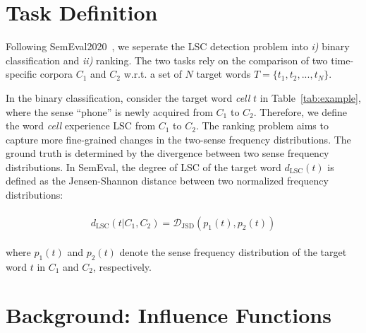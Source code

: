 
\section{Task Definition}


Following SemEval2020~\cite{semeval2020}, we seperate the LSC detection problem into \textit{i)} binary classification and \textit{ii)} ranking.
The two tasks rely on the comparison of two time-specific corpora $C_1$ and $C_2$ w.r.t. a set of $N$ target words $T = \{t_1, t_2, ..., t_N\}$.

In the binary classification, consider the target word \textit{cell} $t$ in Table~\ref{tab:example}, where the sense ``phone'' is newly acquired from $C_1$ to $C_2$. 
Therefore, we define the word \textit{cell} experience LSC from $C_1$ to $C_2$.
The ranking problem aims to capture more fine-grained changes in the two-sense frequency distributions. 
The ground truth is determined by the divergence between two sense frequency distributions.
In SemEval, the degree of LSC of the target word $d_\text{LSC}(t)$ is defined as the Jensen-Shannon distance between two normalized frequency distributions:


\begin{align*} 
\begin{split}
    d_\text{LSC}(t | C_1, C_2) = \mathcal{D}_\text{JSD}(p_1(t), p_2(t))
\end{split}
\end{align*}

\noindent where $p_1(t)$ and $p_2(t)$ denote the sense frequency distribution of the target word $t$ in $C_1$ and $C_2$, respectively.


\begin{table}[t]
\centering
{}
\caption{An example of a sense frequency distribution for the word \textit{cell} in $C_1$ and $C_2$. The table is borrowed from prior work~\cite{semeval2020}.}
\label{tab:example}
\end{table}


\section{Background: Influence Functions}\label{sec:background}

